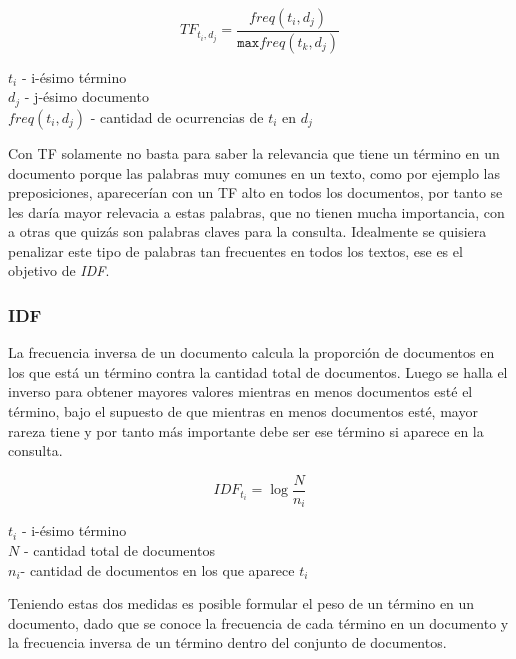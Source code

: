 \documentclass{llncs}
\begin{document}
    \begin{equation}
        TF_{t_i,d_j} = \frac{freq(t_i, d_j)}{\texttt{max} freq (t_k, d_j)} 
    \end{equation}

    \begin{center}
        $t_i$ - i-ésimo término\\
        $d_j$ - j-ésimo documento\\
        $freq(t_i, d_j)$ - cantidad de ocurrencias de $t_i$ en $d_j$
    \end{center}

    Con TF solamente no basta para saber la relevancia que tiene un término en un documento porque las palabras muy comunes en un texto, como por ejemplo las preposiciones, aparecerían con un TF alto en todos los documentos, por tanto se les daría mayor relevacia a estas palabras, que no tienen mucha importancia, con a otras que quizás son palabras claves para la consulta. Idealmente se quisiera penalizar este tipo de palabras tan frecuentes en todos los textos, ese es el objetivo de \emph{IDF}.

    \subsubsection{IDF} La frecuencia inversa de un documento calcula la proporción de documentos en los que está un término contra la cantidad total de documentos. Luego se halla el inverso para obtener mayores valores mientras en menos documentos esté el término, bajo el supuesto de que mientras en menos documentos esté, mayor rareza tiene y por tanto más importante debe ser ese término si aparece en la consulta.

    \begin{equation}
        IDF_{t_i} = \log \frac{N}{n_i}
    \end{equation}

    \begin{center}
        $t_i$ - i-ésimo término\\
        $N$ - cantidad total de documentos\\
        $n_i$- cantidad de documentos en los que aparece $t_i$ 
    \end{center}

    Teniendo estas dos medidas es posible formular el peso de un término en un documento, dado que se conoce la frecuencia de cada término en un documento y la frecuencia inversa de un término dentro del conjunto de documentos. 
\end{document}
